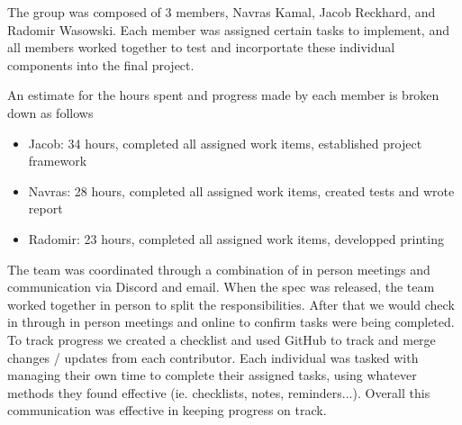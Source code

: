 The group was composed of 3 members, Navras Kamal, Jacob Reckhard, and
Radomir Wasowski.  Each member was assigned certain tasks to implement, and
all members worked together to test and incorportate these individual
components into the final project.

An estimate for the hours spent and progress made by each member is broken down as follows
\begin{itemize}
\item{Jacob: 34 hours, completed all assigned work items, established project framework}
\item{Navras: 28 hours, completed all assigned work items, created tests and wrote report}
\item{Radomir: 23 hours, completed all assigned work items, developped printing}
\end{itemize}

The team was coordinated through a combination of in person meetings and
communication via Discord and email.  When the spec was released, the team
worked together in person to split the responsibilities.  After that we would
check in through in person meetings and online to confirm tasks were being
completed.  To track progress we created a checklist and used GitHub to track
and merge changes / updates from each contributor.  Each individual was tasked
with managing their own time to complete their assigned tasks, using whatever
methods they found effective (ie. checklists, notes, reminders...).  Overall
this communication was effective in keeping progress on track.

